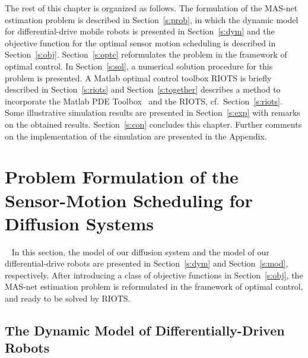     The rest of this chapter is organized as follows. The formulation of the MAS-net estimation problem is described in Section~\ref{s:prob}, in which the dynamic model for differential-drive mobile robots is presented in Section~\ref{s:dym} and the objective function for the optimal sensor motion scheduling is described in Section~\ref{s:obj}.
    Section~\ref{s:optc} reformulates the problem in the framework of optimal control. In Section~\ref{s:sol}, a  numerical solution procedure for this problem is presented. A Matlab optimal control toolbox   RIOTS is briefly described in Section~\ref{s:riots} and
    Section~\ref{s:together} describes a method to incorporate the Matlab PDE Toolbox~\cite{matlabpde} and the RIOTS, cf.\ Section~\ref{s:riots}.
Some illustrative simulation results are presented in Section~\ref{s:exp} with remarks on the obtained results. Section~\ref{s:con} concludes this chapter. Further comments on the implementation of the simulation are presented in the Appendix.


\section{Problem Formulation of the Sensor-Motion Scheduling for Diffusion Systems}~\label{s:prob}
   In this section, the model of our diffusion system and the model of our differential-drive robots are presented in Section~\ref{s:dym} and Section~\ref{s:mod}, respectively. After introducing a class of objective functions in Section~\ref{s:obj}, the MAS-net estimation problem is reformulated in the framework of optimal control, and ready to be solved by RIOTS.

\subsection{The Dynamic Model of Differentially-Driven Robots}~\label{s:dym}

